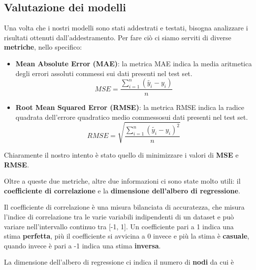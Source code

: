 \documentclass[a4paper, 11pt, oneside]{report}
\begin{document}
                \subsection{Valutazione dei modelli}
                Una volta che i nostri modelli sono stati addestrati e testati, bisogna analizzare i risultati ottenuti
                dall'addestramento. Per fare ciò ci siamo serviti di diverse \textbf{metriche}, nello specifico:
                \begin{itemize}
                    \item \textbf{Mean Absolute Error (MAE)}: la metrica MAE indica la media aritmetica degli errori
                    assoluti commessi sui dati presenti nel test set.
                    \[
                        MSE = \frac{\sum_{i=1}^{n}(\tilde{y_i} - y_i)}{n}
                    \]
                    \item \textbf{Root Mean Squared Error (RMSE)}: la metrica RMSE indica la radice quadrata dell'errore
                    quadratico medio commessosui dati presenti nel test set.
                    \[
                        RMSE = \sqrt {\frac{\sum_{i=1}^{n}(\tilde{y_i} - y_i)^2}{n}}
                    \]
                \end{itemize}
                \par \noindent Chiaramente il nostro intento è stato quello di minimizzare i valori di \textbf{MSE} e
                \textbf{RMSE}.
                \\
                \par \noindent Oltre a queste due metriche, altre due informazioni ci sono state molto utili: il \textbf{coefficiente
                di correlazione} e la \textbf{dimensione dell'albero di regressione}.
                \\
                \par \noindent Il coefficiente di correlazione è una misura bilanciata di accuratezza, che misura l'indice
                di correlazione tra le varie variabili indipendenti di un dataset e può variare nell'intervallo continuo tra [-1, 1].
                Un coefficiente pari a 1 indica una stima \textbf{perfetta}, più il coefficiente si avvicina a 0 invece e più la
                stima è \textbf{casuale}, quando invece è pari a -1 indica una stima \textbf{inversa}.
                \\
                \par \noindent La dimensione dell'albero di regressione ci indica il numero di \textbf{nodi} da cui è
\end{document}
